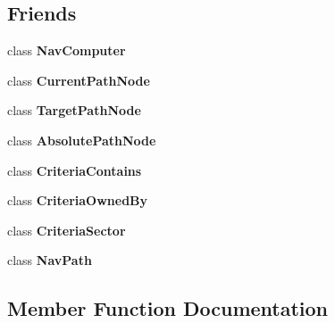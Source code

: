 \subsection*{Friends}
\begin{DoxyCompactItemize}
\item 
class {\bfseries Nav\+Computer}\hypertarget{classNavigationSystem_a1e201bac6febf7e8408c0fe9f486bf2a}{}\label{classNavigationSystem_a1e201bac6febf7e8408c0fe9f486bf2a}

\item 
class {\bfseries Current\+Path\+Node}\hypertarget{classNavigationSystem_a72d2ce294573e4e663ffa0d2ff9917d1}{}\label{classNavigationSystem_a72d2ce294573e4e663ffa0d2ff9917d1}

\item 
class {\bfseries Target\+Path\+Node}\hypertarget{classNavigationSystem_a621cf4220c16b61ae9a97f5343677151}{}\label{classNavigationSystem_a621cf4220c16b61ae9a97f5343677151}

\item 
class {\bfseries Absolute\+Path\+Node}\hypertarget{classNavigationSystem_abdbf5141f7da726083693e239bdac66e}{}\label{classNavigationSystem_abdbf5141f7da726083693e239bdac66e}

\item 
class {\bfseries Criteria\+Contains}\hypertarget{classNavigationSystem_a14e55b3e4e55558c26d928e127d9419b}{}\label{classNavigationSystem_a14e55b3e4e55558c26d928e127d9419b}

\item 
class {\bfseries Criteria\+Owned\+By}\hypertarget{classNavigationSystem_af4290d98abec1e9c608678f618636812}{}\label{classNavigationSystem_af4290d98abec1e9c608678f618636812}

\item 
class {\bfseries Criteria\+Sector}\hypertarget{classNavigationSystem_aa8d00536515f2a6c9aa1bbd73f5fca24}{}\label{classNavigationSystem_aa8d00536515f2a6c9aa1bbd73f5fca24}

\item 
class {\bfseries Nav\+Path}\hypertarget{classNavigationSystem_ad52bb5f8c5442d6b93c1d3150be08380}{}\label{classNavigationSystem_ad52bb5f8c5442d6b93c1d3150be08380}

\end{DoxyCompactItemize}


\subsection{Member Function Documentation}

